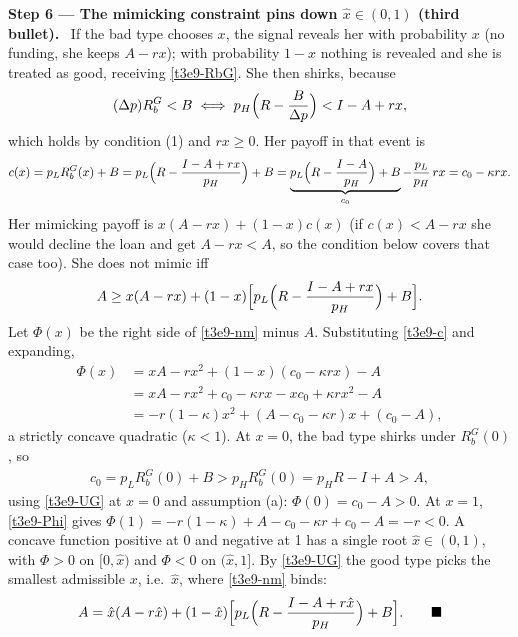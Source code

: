\documentclass[11pt,a4paper]{article}
\newcommand{\step}[2]{\par\medskip\noindent\textbf{Step #1 --- #2.}~}
\begin{document}
\step{6}{The mimicking constraint pins down $\hat x\in(0,1)$ (third bullet)} If the bad type chooses
$x$, the signal reveals her with probability $x$ (no funding, she keeps $A-rx$); with probability $1-x$
nothing is revealed and she is treated as good, receiving \eqref{t3e9-RbG}. She then shirks, because
\begin{align}
  (\Delta p)R_b^G < B \iff p_H\Bigl(R-\frac{B}{\Delta p}\Bigr) < I-A+rx, \nonumber
\end{align}
which holds by condition (1) and $rx\ge0$. Her payoff in that event is
\begin{align}
  c(x) = p_LR_b^G(x)+B = p_L\Bigl(R-\frac{I-A+rx}{p_H}\Bigr)+B
       = \underbrace{p_L\Bigl(R-\frac{I-A}{p_H}\Bigr)+B}_{c_0}-\frac{p_L}{p_H}\,rx = c_0-\kappa rx. \label{t3e9-c}
\end{align} Her mimicking payoff is $x(A-rx)+(1-x)c(x)$ (if $c(x)<A-rx$ she would
decline the loan and get $A-rx<A$, so the condition below covers that case too). She does not mimic iff
\begin{align}
  A \ge x(A-rx)+(1-x)\Bigl[p_L\Bigl(R-\frac{I-A+rx}{p_H}\Bigr)+B\Bigr]. \label{t3e9-nm}
\end{align}
Let $\Phi(x)$ be the right side of \eqref{t3e9-nm} minus $A$. Substituting \eqref{t3e9-c} and expanding,
\begin{align}
  \Phi(x) &= xA-rx^2+(1-x)(c_0-\kappa rx)-A \nonumber\\
          &= xA-rx^2+c_0-\kappa rx-xc_0+\kappa rx^2-A \nonumber\\
          &= -r(1-\kappa)x^2+(A-c_0-\kappa r)x+(c_0-A), \label{t3e9-Phi}
\end{align}
a strictly concave quadratic ($\kappa<1$). At $x=0$, the bad type shirks under $R_b^G(0)$, so
\begin{align}
  c_0 = p_LR_b^G(0)+B > p_HR_b^G(0) = p_HR-I+A > A, \nonumber
\end{align}
using \eqref{t3e9-UG} at $x=0$ and assumption (a): $\Phi(0)=c_0-A>0$. At $x=1$, \eqref{t3e9-Phi} gives
$\Phi(1)=-r(1-\kappa)+A-c_0-\kappa r+c_0-A=-r<0$. A concave function positive at 0 and negative at 1 has a
single root $\hat x\in(0,1)$, with $\Phi>0$ on $[0,\hat x)$ and $\Phi<0$ on $(\hat x,1]$. By
\eqref{t3e9-UG} the good type picks the smallest admissible $x$, i.e.\ $\hat x$, where \eqref{t3e9-nm} binds:
\begin{align}
  A = \hat x(A-r\hat x)+(1-\hat x)\Bigl[p_L\Bigl(R-\frac{I-A+r\hat x}{p_H}\Bigr)+B\Bigr]. \qquad\blacksquare \label{t3e9-xhat}
\end{align}
\end{document}

